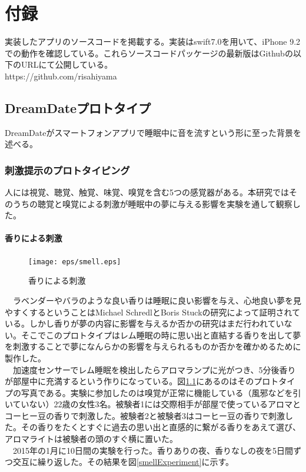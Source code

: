 \chapter{付録}
実装したアプリのソースコードを掲載する。実装はswift7.0を用いて、iPhone 9.2での動作を確認している。これらソースコードパッケージの最新版はGithubの以下のURLにて公開している。 \\
https://github.com/risahiyama

\section{DreamDateプロトタイプ}
DreamDateがスマートフォンアプリで睡眠中に音を流すという形に至った背景を述べる。
\subsection{刺激提示のプロトタイピング}
人には視覚、聴覚、触覚、味覚、嗅覚を含む5つの感覚器がある。本研究ではそのうちの聴覚と嗅覚による刺激が睡眠中の夢に与える影響を実験を通して観察した。

\subsubsection{香りによる刺激}
\begin{figure}[htbp]
\begin{center}
\texttt{[image: eps/smell.eps]}
\caption{香りによる刺激}
\label{smell}
\end{center}
\end{figure}

　ラベンダーやバラのような良い香りは睡眠に良い影響を与え、心地良い夢を見やすくするということはMichael SchredlとBoris Stuckの研究によって証明されている\cite{roseDream}。しかし香りが夢の内容に影響を与えるか否かの研究はまだ行われていない。そこでこのプロトタイプはレム睡眠の時に思い出と直結する香りを出して夢を刺激することで夢になんらかの影響を与えられるものか否かを確かめるために製作した。\\
　加速度センサーでレム睡眠を検出したらアロマランプに光がつき、5分後香りが部屋中に充満するという作りになっている。図\ref{smell}にあるのはそのプロトタイプの写真である。実験に参加したのは嗅覚が正常に機能している（風邪などを引いていない）22歳の女性3名。被験者1には交際相手が部屋で使っているアロマとコーヒー豆の香りで刺激した。被験者2と被験者3はコーヒー豆の香りで刺激した。その香りをたくとすぐに過去の思い出と直感的に繋がる香りをあえて選び、アロマライトは被験者の頭のすぐ横に置いた。\\
　2015年の1月に10日間の実験を行った。香りありの夜、香りなしの夜を5日間ずつ交互に繰り返した。その結果を図\ref{smellExperiment}に示す。

